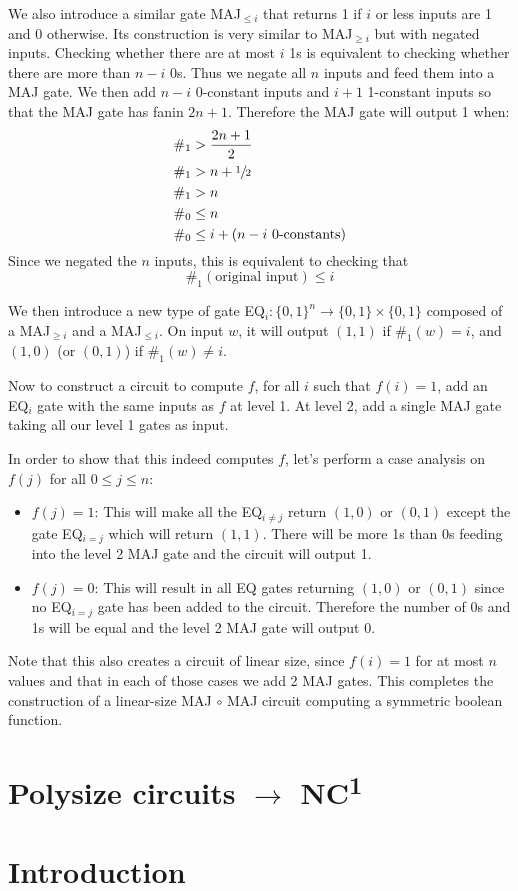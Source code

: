 \documentclass{article}
\begin{document}
We also introduce a similar gate MAJ$_{\leq i}$ that returns 1 if $i$ or less inputs are 1 and 0 otherwise. Its construction is very similar to MAJ$_{\geq i}$ but with negated inputs. Checking whether there are at most $i$ 1s is equivalent to checking whether there are more than $n-i$ 0s. Thus we negate all $n$ inputs and feed them into a MAJ gate. We then add $n-i$ 0-constant inputs and $i+1$ 1-constant inputs so that the MAJ gate has fanin $2n+1$. Therefore the MAJ gate will output 1 when:
\begin{align*}
\#_1 &> \frac{2n+1}{2} \\
\#_1 &> n + \sfrac{1}{2} \\
\#_1 &> n \\
\#_0 &\leq n \\ 
\#_0 &\leq i + (n-i \text{ 0-constants})
\end{align*}
Since we negated the $n$ inputs, this is equivalent to checking that $$\#_1(\text{original input}) \leq i$$

We then introduce a new type of gate EQ$_i:\{0,1\}^n\rightarrow\{0,1\}\times\{0,1\}$ composed of a MAJ$_{\geq i}$ and a MAJ$_{\leq i}$. On input $w$, it will output $(1,1)$ if $\#_1(w)=i$, and $(1,0)$ (or $(0,1)$) if $\#_1(w)\not=i$.

Now to construct a circuit to compute $f$, for all $i$ such that $f(i)=1$, add an EQ$_i$ gate with the same inputs as $f$ at level 1.  At level 2, add a single MAJ gate taking all our level 1 gates as input.

In order to show that this indeed computes $f$, let's perform a case analysis on $f(j)$ for all $0\leq j \leq n$:
\begin{itemize}
\item $f(j)=1$: This will make all the EQ$_{i\not=j}$ return $(1,0)$ or $(0,1)$ except the gate EQ$_{i=j}$ which will return $(1,1)$. There will be more 1s than 0s feeding into the level 2 MAJ gate and the circuit will output 1.

\item $f(j)=0$: This will result in all EQ gates returning $(1,0)$ or $(0,1)$ since no EQ$_{i=j}$ gate has been added to the circuit. Therefore the number of 0s and 1s will be equal and the level 2 MAJ gate will output 0.

\end{itemize}

Note that this also creates a circuit of linear size, since $f(i)=1$ for at most $n$ values and that in each of those cases we add 2 MAJ gates. This completes the construction of a linear-size MAJ $\circ$ MAJ circuit computing a symmetric boolean function. 

\newpage
\section{Polysize circuits $\rightarrow$ NC\textsuperscript{1}}

\newpage
\section{Introduction}
\end{document}
